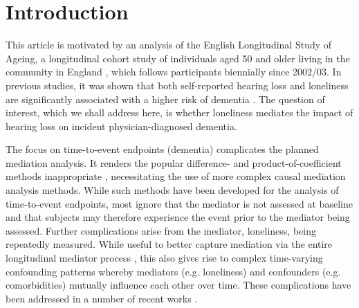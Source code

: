 \documentclass[AMA,STIX1COL]{WileyNJD-v2}
\begin{document}


\maketitle



\section{Introduction}\label{sec1}

This article is motivated by an analysis of the English Longitudinal Study of Ageing, a longitudinal cohort study of individuals aged 50 and older living in the community in England \citep{steptoe2013cohort, davies2017}, which follows participants biennially since 2002/03.
In previous studies, it was shown that both self-reported hearing loss and loneliness are significantly associated with a higher risk of dementia \citep{davies2017, davies18, rafnsson2020loneliness}. The question of interest, which we shall address here, is whether loneliness mediates the impact of hearing loss on incident physician-diagnosed dementia.

The focus on time-to-event endpoints (dementia) complicates the planned mediation analysis. It renders the popular difference- and product-of-coefficient methods inappropriate \citep{vdw16, robin92, pearl01}, necessitating the use of more complex causal mediation analysis methods. While such methods have been developed for the analysis of time-to-event endpoints, most ignore that the mediator is not assessed at baseline and that subjects may therefore experience the event prior to the mediator being assessed\citep{lange13,huang17,vandenberghe2018surrogate}. Further complications arise from the mediator, loneliness, being repeatedly measured. While useful to better capture mediation via the entire longitudinal mediator process \citep{vansteelandt19}, this also gives rise to complex time-varying confounding patterns whereby mediators (e.g. loneliness) and confounders (e.g. comorbidities) mutually influence each other over time. These complications have been addressed in a number of recent works \citep{zheng2017longitudinal,lin17,vansteelandt19}.
\end{document}
